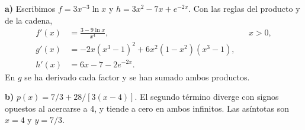 \textbf{a)} Escribimos $f=3x^{-3}\ln x$ y $h=3x^2-7x+e^{-2x}$.
Con las reglas del producto y de la cadena,
\[
\begin{aligned}
f'(x)&=\frac{3-9\ln x}{x^4}, &&x>0,\\
g'(x)&=-2x(x^3-1)^2+6x^2(1-x^2)(x^3-1),\\
h'(x)&=6x-7-2e^{-2x}.
\end{aligned}
\]
En $g$ se ha derivado cada factor y se han sumado ambos productos.

\textbf{b)} $p(x)=7/3+28/[3(x-4)]$. El segundo término
diverge con signos opuestos al acercarse a 4, y tiende a
cero en ambos infinitos. Las asíntotas son $\boxed{x=4}$
y $\boxed{y=7/3}$.
